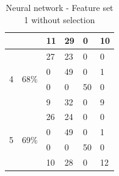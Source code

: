\documentclass[USenglish]{ifimaster}  %
\begin{document}
\begin{table}[h]
\begin{tabular}{@{}llllll@{}}
		\multicolumn{1}{l|}{} & \multicolumn{1}{l|}{} & \multicolumn{1}{l|}{11} & \multicolumn{1}{l|}{29} & \multicolumn{1}{l|}{0} & 10 \\ \midrule
		\multicolumn{1}{l|}{\multirow{4}{*}{4}} & \multicolumn{1}{l|}{\multirow{4}{*}{68\%}} & \multicolumn{1}{l|}{27} & \multicolumn{1}{l|}{23} & \multicolumn{1}{l|}{0} & 0 \\ \cmidrule(l){3-6} 
		\multicolumn{1}{l|}{} & \multicolumn{1}{l|}{} & \multicolumn{1}{l|}{0} & \multicolumn{1}{l|}{49} & \multicolumn{1}{l|}{0} & 1 \\ \cmidrule(l){3-6} 
		\multicolumn{1}{l|}{} & \multicolumn{1}{l|}{} & \multicolumn{1}{l|}{0} & \multicolumn{1}{l|}{0} & \multicolumn{1}{l|}{50} & 0 \\ \cmidrule(l){3-6} 
		\multicolumn{1}{l|}{} & \multicolumn{1}{l|}{} & \multicolumn{1}{l|}{9} & \multicolumn{1}{l|}{32} & \multicolumn{1}{l|}{0} & 9 \\ \midrule
		\multicolumn{1}{l|}{\multirow{4}{*}{5}} & \multicolumn{1}{l|}{\multirow{4}{*}{69\%}} & \multicolumn{1}{l|}{26} & \multicolumn{1}{l|}{24} & \multicolumn{1}{l|}{0} & 0 \\ \cmidrule(l){3-6} 
		\multicolumn{1}{l|}{} & \multicolumn{1}{l|}{} & \multicolumn{1}{l|}{0} & \multicolumn{1}{l|}{49} & \multicolumn{1}{l|}{0} & 1 \\ \cmidrule(l){3-6} 
		\multicolumn{1}{l|}{} & \multicolumn{1}{l|}{} & \multicolumn{1}{l|}{0} & \multicolumn{1}{l|}{0} & \multicolumn{1}{l|}{50} & 0 \\ \cmidrule(l){3-6} 
		\multicolumn{1}{l|}{} & \multicolumn{1}{l|}{} & \multicolumn{1}{l|}{10} & \multicolumn{1}{l|}{28} & \multicolumn{1}{l|}{0} & 12 \\ \bottomrule
	\end{tabular}
	\caption{Neural network - Feature set 1 without selection}
	\label{nn2}
\end{table}
\FloatBarrier
\end{document}
